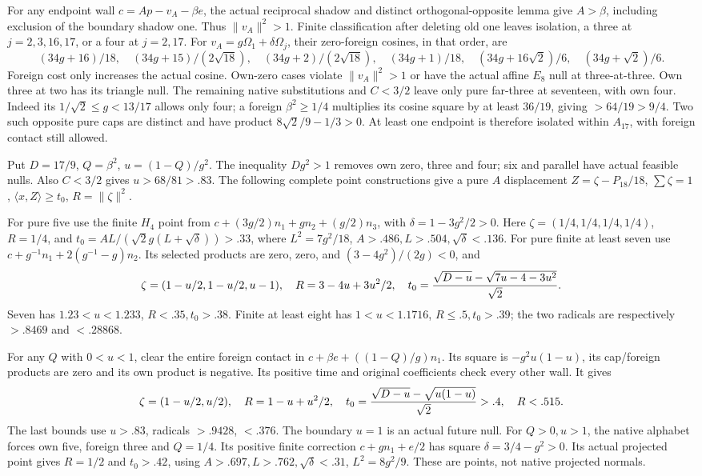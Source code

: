 \documentclass[11pt]{article}
\theoremstyle{definition}
\theoremstyle{remark}
\newcommand{\ip}[2]{\langle #1,#2\rangle}
\newcommand{\norm}[1]{\lVert #1\rVert}
\begin{document}
For any endpoint wall \(c=Ap-v_A-\beta e\), the actual reciprocal
shadow and distinct orthogonal-opposite lemma give \(A>\beta\),
including exclusion of the boundary shadow one. Thus
\(\norm{v_A}^2>1\). Finite classification after deleting old one
leaves isolation, a three at \(j=2,3,16,17\), or a four at
\(j=2,17\). For \(v_A=g\Omega_1+\delta\Omega_j\), their
zero-foreign cosines, in that order, are
\[
 (34g+16)/18,\quad(34g+15)/(2\sqrt{18}),\quad
 (34g+2)/(2\sqrt{18}),\quad(34g+1)/18,\quad
 (34g+16\sqrt2)/6,\quad(34g+\sqrt2)/6.
\]
Foreign cost only increases the actual cosine. Own-zero cases violate
\(\norm{v_A}^2>1\) or have the actual affine \(E_8\) null at
three-at-three. Own three at two has its triangle null. The remaining
native substitutions and \(C<3/2\) leave only pure far-three at
seventeen, with own four. Indeed its \(1/\sqrt2\le g<13/17\)
allows only four; a foreign \(\beta^2\ge1/4\) multiplies its
cosine square by at least \(36/19\), giving \(>64/19>9/4\).
Two such opposite pure caps are distinct and have product
\(8\sqrt2/9-1/3>0\). At least one endpoint is therefore isolated
within \(A_{17}\), with foreign contact still allowed.

Put \(D=17/9\), \(Q=\beta^2\), \(u=(1-Q)/g^2\).
The inequality \(Dg^2>1\) removes own zero, three and four;
six and parallel have actual feasible nulls. Also \(C<3/2\)
gives \(u>68/81>.83\). The following complete point constructions
give a pure \(A\) displacement \(Z=\zeta-P_{18}/18\),
\(\sum\zeta=1\), \(\ip xZ\ge t_0\), \(R=\norm\zeta^2\).

For pure five use the finite \(H_4\) point from
\(c+(3g/2)n_1+gn_2+(g/2)n_3\), with
\(\delta=1-3g^2/2>0\). Here \(\zeta=(1/4,1/4,1/4,1/4)\),
\(R=1/4\), and
\(t_0=AL/(\sqrt2g(L+\sqrt\delta))>.33\), where
\(L^2=7g^2/18\), \(A>.486,L>.504,\sqrt\delta<.136\).
For pure finite at least seven use
\(c+g^{-1}n_1+2(g^{-1}-g)n_2\). Its selected products are
zero, zero, and \((3-4g^2)/(2g)<0\), and
\[
 \zeta=(1-u/2,1-u/2,u-1),\quad R=3-4u+3u^2/2,
 \quad t_0={\sqrt{D-u}-\sqrt{7u-4-3u^2}\over\sqrt2}.
\]
Seven has \(1.23<u<1.233\), \(R<.35,t_0>.38\).
Finite at least eight has \(1<u<1.1716\), \(R\le.5,t_0>.39\);
the two radicals are respectively \(>.8469\) and \(<.28868\).

For any \(Q\) with \(0<u<1\), clear the entire foreign contact
in \(c+\beta e+((1-Q)/g)n_1\). Its square is
\(-g^2u(1-u)\), its cap/foreign products are zero and its own
product is negative. Its positive time and original coefficients
check every other wall. It gives
\[
 \zeta=(1-u/2,u/2),\quad R=1-u+u^2/2,\quad
 t_0={\sqrt{D-u}-\sqrt{u(1-u)}\over\sqrt2}>.4,
 \quad R<.515.
\]
The last bounds use \(u>.83\), radicals \(>.9428\), \(<.376\).
The boundary \(u=1\) is an actual future null.
For \(Q>0,u>1\), the native alphabet forces own five,
foreign three and \(Q=1/4\). Its positive finite correction
\(c+gn_1+e/2\) has square \(\delta=3/4-g^2>0\).
Its actual projected point gives \(R=1/2\) and \(t_0>.42\),
using \(A>.697,L>.762,\sqrt\delta<.31\),
\(L^2=8g^2/9\). These are points, not native projected normals.
\end{document}
